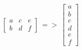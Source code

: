 \documentclass[12 pt]{slides}
\begin{document}
\begingroup
\[\begin{bmatrix}a & c & e\\b & d & f\end{bmatrix}\ =>
\ \begin{bmatrix}a\\b\\c\\d\\e\\f\end{bmatrix}\]
\endgroup
\end{document}

